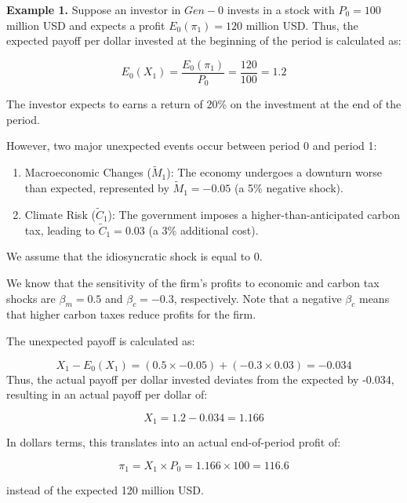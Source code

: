 \begin{example}[]
\textbf{Example 1.} 
Suppose an investor in $Gen-0$ invests in a stock
with $P_0 = 100$ million USD and
expects a profit $E_0(\pi_1) = 120$ million USD.
Thus, the expected payoff 
per dollar invested at the 
beginning of the period is calculated as:

\begin{equation}
    E_0(X_1) = \frac{E_0(\pi_1)}{P_0} = \frac{120}{100} = 1.2
\end{equation}

The investor expects to earns a return of 20\% on the investment
at the end of the period.

However, two major unexpected events occur 
between period 0 and period 1:

\begin{enumerate}
    \item Macroeconomic Changes (\(\tilde{M}_1\)): The economy undergoes a downturn worse than expected, represented by \(\tilde{M}_1 = -0.05\) (a 5\% negative shock).
    \item Climate Risk (\(\tilde{C}_1\)): The government imposes a higher-than-anticipated carbon tax, leading to \(\tilde{C}_1 = 0.03\) (a 3\% additional cost).
\end{enumerate}

We assume that the idiosyncratic shock is equal to 0.

We know that the sensitivity of the firm's 
profits to economic and carbon tax shocks 
are $\beta_m = 0.5$ and $\beta_{c} = - 0.3$, 
respectively. Note that a negative $\beta_{c}$
means that higher carbon taxes reduce profits
for the firm.

The unexpected payoff is calculated as:

\[
X_1 - E_0(X_1) = (0.5 \times -0.05) + (- 0.3 \times 0.03) = -0.034
\]
Thus, the actual payoff per dollar 
invested deviates from the expected 
by -0.034, resulting 
in an actual payoff per dollar of:

\begin{equation}
    X_1 = 1.2-0.034 = 1.166
\end{equation}

In dollars terms, this translates 
into an actual end-of-period profit of:

\begin{equation}
    \pi_1 = X_1 \times P_0 = 1.166 \times 100 = 116.6
\end{equation}

instead of the expected 120 million USD.

\end{example}


